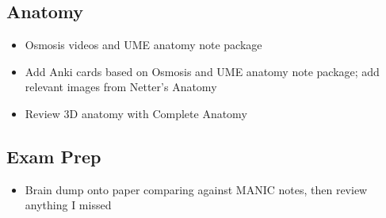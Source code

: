 \documentclass{article}
\begin{document}
\subsection{Anatomy}

\begin{itemize}
    \item Osmosis videos and UME anatomy note package
    \item Add Anki cards based on Osmosis and UME anatomy note package; add relevant images from Netter's Anatomy
    \item Review 3D anatomy with Complete Anatomy
\end{itemize}

\subsection{Exam Prep}

\begin{itemize}
    \item Brain dump onto paper comparing against MANIC notes, then review anything I missed
\end{itemize}
\end{document}
